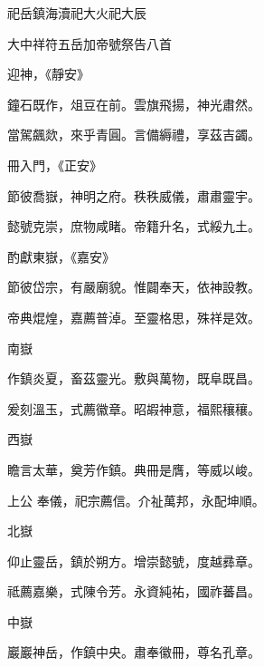 
\begin{pinyinscope}

 祀岳鎮海瀆祀大火祀大辰



 大中祥符五岳加帝號祭告八首



 迎神，《靜安》



 鐘石既作，俎豆在前。雲旗飛揚，神光肅然。



 當駕飆欻，來乎青圓。言備縟禮，享茲吉蠲。



 冊入門，《正安》



 節彼喬嶽，神明之府。秩秩威儀，肅肅靈宇。



 懿號克崇，庶物咸睹。帝籍升名，式綏九土。



 酌獻東嶽，《嘉安》



 節彼岱宗，有嚴廟貌。惟闢奉天，依神設教。



 帝典焜煌，嘉薦普淖。至靈格思，殊祥是效。



 南嶽



 作鎮炎夏，畜茲靈光。敷與萬物，既阜既昌。



 爰刻溫玉，式薦徽章。昭嘏神意，福熙穰穰。



 西嶽



 瞻言太華，奠芳作鎮。典冊是膺，等威以峻。



 上公
 奉儀，祀宗薦信。介祉萬邦，永配坤順。



 北嶽



 仰止靈岳，鎮於朔方。增崇懿號，度越彞章。



 祗薦嘉樂，式陳令芳。永資純祐，國祚蕃昌。



 中嶽



 巖巖神岳，作鎮中央。肅奉徽冊，尊名孔章。




\end{pinyinscope}
